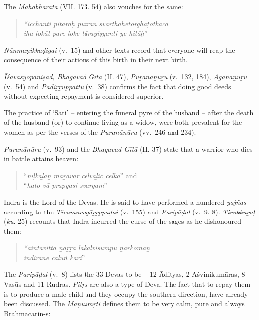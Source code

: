 The \textit{Mahābhārata} (VII. 173. 54) also vouches for the same:

\begin{quote}
\textit{“icchanti pitaraḥ putrān svārthahetorghaṭotkaca}\\\textit{iha lokāt pare loke tārayiṣyanti ye hitāḥ}”
\end{quote}

\textit{Nāṉmaṇikkaḍigai} (v.~15) and other texts record that everyone will reap the consequence of their actions of this birth in their next birth.

\textit{Īśāvāsyopaniṣad, Bhagavad Gītā} (II. 47), \textit{Puṟanāṉūṟu} (v.\ 132, 184), \textit{Aganāṉūṟu \\} (v.~54) and \textit{Padiṟṟuppattu} (v.~38) confirms the fact that doing good deeds without expecting repayment is considered superior.

The practice of ‘Sati’ – entering the funeral pyre of the husband – after the death of the husband (or) to continue living as a widow, were both prevalent for the women as per the verses of the \textit{Puṟanāṉūṟu} (vv.~246 and 234).

\textit{Puṟanāṉūṟu} (v.~93) and the \textit{Bhagavad Gītā} (II. 37) state that a warrior who dies in battle attains heaven:

\begin{quote}
“\textit{nīḷkaḻaṉ maṟavar celvaḻic celka}” and \\ “\textit{hato vā prapyasi svargam}”
\end{quote}

Indra is the Lord of the Devas. He is said to have performed a hundered \textit{yajñas} according to the \textit{Tirumurugāṟṟppaḍai} (v.~155) and \textit{Paripāḍal} (v.~9. 8). \textit{Tirukkuṟaḷ} (\textit{ku}. 25) recounts that Indra incurred the curse of the sages as he dishonoured them:

\begin{quote}
\textit{“aintavittā ṉāṟṟa lakalvisumpu ṉārkōmāṉ}\\\textit{indiranē cāluṅ kari}”
\end{quote}

The \textit{Paripāḍal} (v.~8) lists the 33 Devas to be – 12 Ādityas, 2 Aśvinikumāras, 8 Vasūs and 11 Rudras. \textit{Pitṛs} are also a type of Deva. The fact that to repay them is to produce a male child and they occupy the southern direction, have already been discussed. The \textit{Maṇusmṛti} defines them to be very calm, pure and always Brahmacārin-s:

